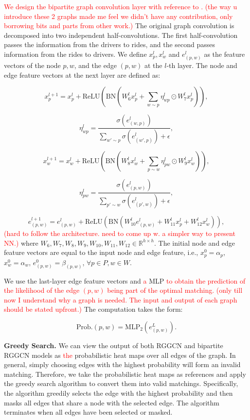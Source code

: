 \documentclass[sigconf]{acmart}
\newcommand{\tcr}[1]{{\textcolor{red}{#1}}}
\begin{document}
\tcr{We design the bipartite graph convolution layer with reference to
\cite{gasse2019exact}. 
(the way u introduce these 2 graphs made me feel we didn't have any contribution, only borrowing bits and parts from other work.)}
The original graph convolution is decomposed
into two independent half-convolutions. The first half-convolution
passes the information from the drivers to rides, and the second passes
information from the rides to drivers. We define $x_{p}^{l},x_{w}^{l}$
and $e_{(p,w)}^{l}$ as the feature vectors of the node $p,w$, and
the edge $(p,w)$ at the $l$-th layer. The node and edge feature
vectors at the next layer are defined as: 

\[
x_{p}^{l+1}=x_{p}^{l}+\text{ReLU}(\text{BN}(W_{6}^{l}x_{p}^{l}+\sum_{w\sim p}\eta_{wp}^{l}\odot W_{7}^{l}x_{p}^{l})),
\]

\[
\eta_{wp}^{l}=\frac{\sigma(e_{(w,p)}^{l})}{\sum_{w'\sim p}\sigma(e_{(w',p)}^{l})+\epsilon},
\]

\[
x_{w}^{l+1}=x_{w}^{l}+\text{ReLU}(\text{BN}(W_{8}^{l}x_{w}^{l}+\sum_{p\sim w}\eta_{pw}^{l}\odot W_{9}^{l}x_{w}^{l})),
\]

\[
\eta_{pw}^{l}=\frac{\sigma(e_{(p,w)}^{l})}{\sum_{p'\sim w}\sigma(e_{(p',w)}^{l})+\epsilon},
\]

\[
e_{(p,w)}^{l+1}=e_{(p,w)}^{l}+\text{ReLU}(\text{BN}(W_{10}^{l}e_{(p,w)}^{l}+W_{11}^{l}x_{p}^{l}+W_{12}^{l}x_{w}^{l})),
\]
\tcr{(hard to follow the architecture. need to come up w. a simpler way to present NN.)}
where $W_{6},W_{7},W_{8},W_{9},W_{10},W_{11},W_{12}\in\mathbb{R}^{h\times h}$.
The initial node and edge feature vectors are equal to the input node
and edge feature, i.e., $x_{p}^{0}=\alpha_{p}$, $x_{w}^{0}=\alpha_{w}$,
$e_{(p,w)}^{0}=\beta_{(p,w)}$, $\forall p\in P,w\in W$. 

We use the last-layer edge feature vectors and \tcr{a} MLP \tcr{to obtain the
prediction of the likelihood of the edge $(p,w)$ being part of the
optimal matching. (only till now I understand why a graph is needed. The input and output of each graph should be stated upfront.)} 
The computation takes the form:

\[
\text{Prob.}(p,w)=\text{MLP}_{2}(e_{(p,w)}^{L}).
\]

\textbf{Greedy Search.} We can view the output of both RGGCN and bipartite
RGGCN models as \tcr{the} probabilistic heat maps over all edges of the
graph. In general, simply choosing edges with the highest probability
will form an invalid matching. Therefore, we take the probabilistic
heat maps as references and apply the greedy search algorithm to convert
them into valid matchings. Specifically, the algorithm greedily selects
the edge with the highest probability and then masks all edges that
share a node with the selected edge. The algorithm terminates when
all edges have been selected or masked. 
\end{document}
